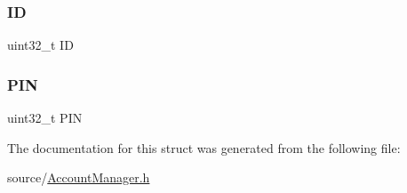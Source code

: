 \subsubsection{\texorpdfstring{ID}{ID}}
{\footnotesize\ttfamily uint32\+\_\+t ID}

\mbox{\label{struct_users_a91ee63dd24a702a6b71474783c75a66c}} 
\subsubsection{\texorpdfstring{P\+IN}{PIN}}
{\footnotesize\ttfamily uint32\+\_\+t P\+IN}



The documentation for this struct was generated from the following file\+:\begin{DoxyCompactItemize}
\item 
source/\mbox{\hyperlink{_account_manager_8h}{Account\+Manager.\+h}}\end{DoxyCompactItemize}
